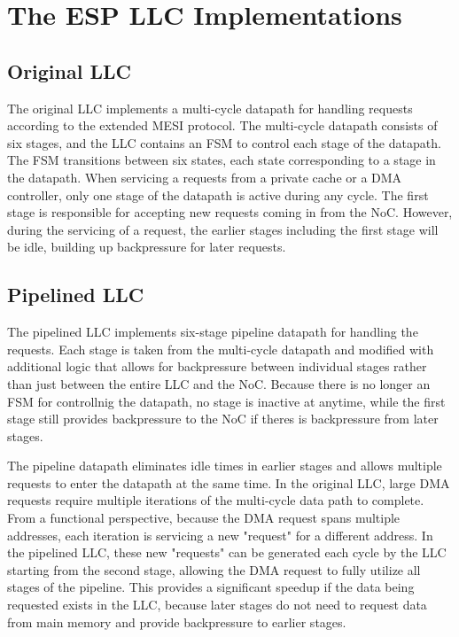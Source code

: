 \documentclass{sig-alternate}
\begin{document}
\section{The ESP LLC Implementations}
\label{sec:llcImplementations}
\subsection{Original LLC}
The original LLC implements a multi-cycle datapath for handling requests according to the extended MESI protocol. The multi-cycle datapath consists of six stages, and the LLC contains an FSM to control each stage of the datapath.
The FSM transitions between six states, each state corresponding to a stage in the datapath. 
When servicing a requests from a private cache or a DMA controller, only one stage of the datapath is active during any cycle. The first stage is responsible for accepting 
new requests coming in from the NoC. However, during the servicing of a request, the earlier stages including the first stage will be idle, building up backpressure for later requests.
\subsection{Pipelined LLC}
The pipelined LLC implements six-stage pipeline datapath for handling the requests. Each stage is taken from the multi-cycle datapath and modified with additional logic 
that allows for backpressure between individual stages rather than just between the entire LLC and the NoC. Because there is no longer an FSM for controllnig the datapath, 
no stage is inactive at anytime, while the first stage still provides backpressure to the NoC if theres is backpressure from later stages.
\par The pipeline datapath eliminates idle times in earlier stages and allows multiple requests to enter the datapath at the same time. 
In the original LLC, large DMA requests require multiple iterations of the multi-cycle data path to complete. From a functional perspective, because 
the DMA request spans multiple addresses, each iteration is servicing a new "request" for a different address. In the pipelined LLC, these new "requests" can be generated 
each cycle by the LLC starting from the second stage, allowing the DMA request to fully utilize all stages of the pipeline. This provides a significant speedup if the data 
being requested exists in the LLC, because later stages do not need to request data from main memory and provide backpressure to earlier stages.
\end{document}

